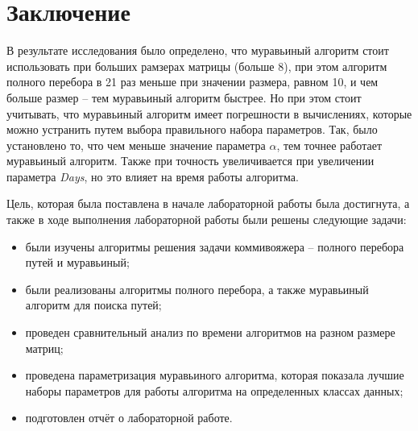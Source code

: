 \chapter*{Заключение}

В результате исследования было определено, что муравьиный алгоритм стоит использовать при больших рамзерах матрицы (больше 8), при этом алгоритм полного перебора в 21 раз меньше при значении размера, равном 10, и чем больше размер -- тем муравьиный алгоритм быстрее. Но при этом стоит учитывать, что муравьиный алгоритм имеет погрешности в вычислениях, которые можно устранить путем выбора правильного набора параметров. Так, было установлено то, что чем меньше значение параметра $\alpha$, тем точнее работает муравьиный алгоритм. Также при точность увеличивается при увеличении параметра \textit{Days}, но это влияет на время работы алгоритма.

Цель, которая была поставлена в начале лабораторной работы была достигнута, а также в ходе выполнения лабораторной работы были решены следующие задачи:

\begin{itemize}
	\item были изучены алгоритмы решения задачи коммивояжера -- полного перебора путей и муравьиный;
    \item были реализованы алгоритмы полного перебора, а также муравьиный алгоритм для поиска путей;
	\item проведен сравнительный анализ по времени алгоритмов на разном размере матриц;
	\item проведена параметризация муравьиного алгоритма, которая показала лучшие наборы параметров для работы алгоритма на определенных классах данных;
	\item подготовлен отчёт о лабораторной работе.
\end{itemize}